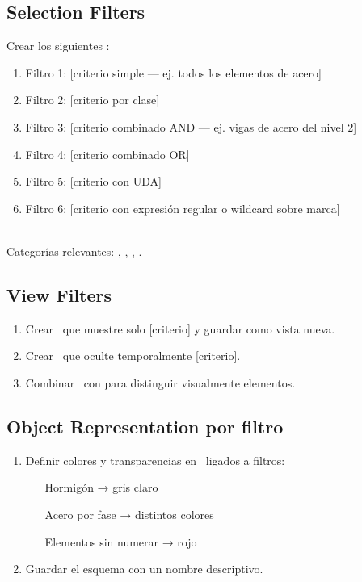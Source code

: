 \documentclass[11pt,a4paper]{article}
\begin{document}
\subsection{Selection Filters}
Crear los siguientes \SF:
\begin{enumerate}
    \item Filtro 1: [criterio simple — ej. todos los elementos de acero]
    \item Filtro 2: [criterio por clase]
    \item Filtro 3: [criterio combinado AND — ej. vigas de acero del nivel 2]
    \item Filtro 4: [criterio combinado OR]
    \item Filtro 5: [criterio con UDA]
    \item Filtro 6: [criterio con expresión regular o wildcard sobre marca]
\end{enumerate}

\begin{comando}
 \\
Categorías relevantes: , , , .
\end{comando}

\subsection{View Filters}
\begin{enumerate}
    \item Crear \VF\ que muestre solo [criterio] y guardar como vista nueva.
    \item Crear \VF\ que oculte temporalmente [criterio].
    \item Combinar \VF\ con  para distinguir visualmente elementos.
\end{enumerate}

\subsection{Object Representation por filtro}
\begin{enumerate}
    \item Definir colores y transparencias en \OR\ ligados a filtros:
    \begin{itemize}
        \item [Hormigón → gris claro]
        \item [Acero por fase → distintos colores]
        \item [Elementos sin numerar → rojo]
    \end{itemize}
    \item Guardar el esquema con un nombre descriptivo.
\end{enumerate}
\end{document}
